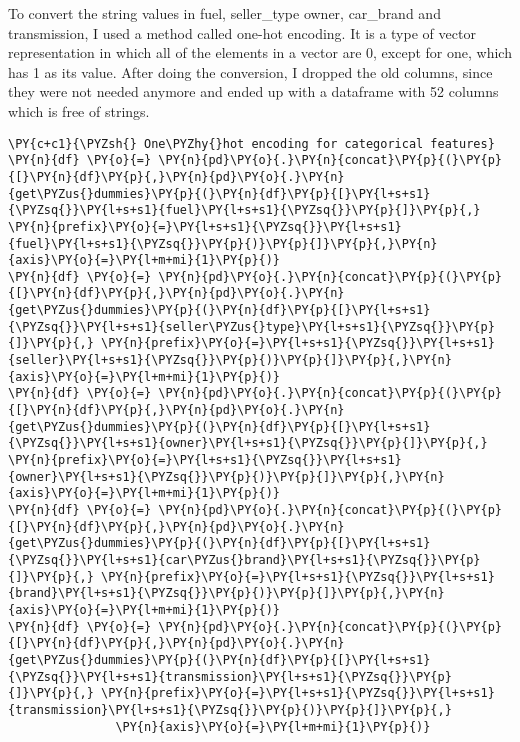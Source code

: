 To convert the string values in fuel, seller\_type owner, car\_brand and
transmission, I used a method called one-hot encoding. It is a type of vector
representation in which all of the elements in a vector are 0, except for one,
which has 1 as its value. After doing the conversion, I dropped the old columns,
since they were not needed anymore and ended up with a dataframe with 52 columns
which is free of strings.

\begin{tcolorbox}[breakable, size=fbox, boxrule=1pt, pad at break*=1mm,colback=cellbackground, colframe=cellborder]
\begin{Verbatim}[commandchars=\\\{\}]
\PY{c+c1}{\PYZsh{} One\PYZhy{}hot encoding for categorical features}
\PY{n}{df} \PY{o}{=} \PY{n}{pd}\PY{o}{.}\PY{n}{concat}\PY{p}{(}\PY{p}{[}\PY{n}{df}\PY{p}{,}\PY{n}{pd}\PY{o}{.}\PY{n}{get\PYZus{}dummies}\PY{p}{(}\PY{n}{df}\PY{p}{[}\PY{l+s+s1}{\PYZsq{}}\PY{l+s+s1}{fuel}\PY{l+s+s1}{\PYZsq{}}\PY{p}{]}\PY{p}{,} \PY{n}{prefix}\PY{o}{=}\PY{l+s+s1}{\PYZsq{}}\PY{l+s+s1}{fuel}\PY{l+s+s1}{\PYZsq{}}\PY{p}{)}\PY{p}{]}\PY{p}{,}\PY{n}{axis}\PY{o}{=}\PY{l+m+mi}{1}\PY{p}{)}
\PY{n}{df} \PY{o}{=} \PY{n}{pd}\PY{o}{.}\PY{n}{concat}\PY{p}{(}\PY{p}{[}\PY{n}{df}\PY{p}{,}\PY{n}{pd}\PY{o}{.}\PY{n}{get\PYZus{}dummies}\PY{p}{(}\PY{n}{df}\PY{p}{[}\PY{l+s+s1}{\PYZsq{}}\PY{l+s+s1}{seller\PYZus{}type}\PY{l+s+s1}{\PYZsq{}}\PY{p}{]}\PY{p}{,} \PY{n}{prefix}\PY{o}{=}\PY{l+s+s1}{\PYZsq{}}\PY{l+s+s1}{seller}\PY{l+s+s1}{\PYZsq{}}\PY{p}{)}\PY{p}{]}\PY{p}{,}\PY{n}{axis}\PY{o}{=}\PY{l+m+mi}{1}\PY{p}{)}
\PY{n}{df} \PY{o}{=} \PY{n}{pd}\PY{o}{.}\PY{n}{concat}\PY{p}{(}\PY{p}{[}\PY{n}{df}\PY{p}{,}\PY{n}{pd}\PY{o}{.}\PY{n}{get\PYZus{}dummies}\PY{p}{(}\PY{n}{df}\PY{p}{[}\PY{l+s+s1}{\PYZsq{}}\PY{l+s+s1}{owner}\PY{l+s+s1}{\PYZsq{}}\PY{p}{]}\PY{p}{,} \PY{n}{prefix}\PY{o}{=}\PY{l+s+s1}{\PYZsq{}}\PY{l+s+s1}{owner}\PY{l+s+s1}{\PYZsq{}}\PY{p}{)}\PY{p}{]}\PY{p}{,}\PY{n}{axis}\PY{o}{=}\PY{l+m+mi}{1}\PY{p}{)}
\PY{n}{df} \PY{o}{=} \PY{n}{pd}\PY{o}{.}\PY{n}{concat}\PY{p}{(}\PY{p}{[}\PY{n}{df}\PY{p}{,}\PY{n}{pd}\PY{o}{.}\PY{n}{get\PYZus{}dummies}\PY{p}{(}\PY{n}{df}\PY{p}{[}\PY{l+s+s1}{\PYZsq{}}\PY{l+s+s1}{car\PYZus{}brand}\PY{l+s+s1}{\PYZsq{}}\PY{p}{]}\PY{p}{,} \PY{n}{prefix}\PY{o}{=}\PY{l+s+s1}{\PYZsq{}}\PY{l+s+s1}{brand}\PY{l+s+s1}{\PYZsq{}}\PY{p}{)}\PY{p}{]}\PY{p}{,}\PY{n}{axis}\PY{o}{=}\PY{l+m+mi}{1}\PY{p}{)}
\PY{n}{df} \PY{o}{=} \PY{n}{pd}\PY{o}{.}\PY{n}{concat}\PY{p}{(}\PY{p}{[}\PY{n}{df}\PY{p}{,}\PY{n}{pd}\PY{o}{.}\PY{n}{get\PYZus{}dummies}\PY{p}{(}\PY{n}{df}\PY{p}{[}\PY{l+s+s1}{\PYZsq{}}\PY{l+s+s1}{transmission}\PY{l+s+s1}{\PYZsq{}}\PY{p}{]}\PY{p}{,} \PY{n}{prefix}\PY{o}{=}\PY{l+s+s1}{\PYZsq{}}\PY{l+s+s1}{transmission}\PY{l+s+s1}{\PYZsq{}}\PY{p}{)}\PY{p}{]}\PY{p}{,}
               \PY{n}{axis}\PY{o}{=}\PY{l+m+mi}{1}\PY{p}{)}
\end{Verbatim}
\end{tcolorbox}


